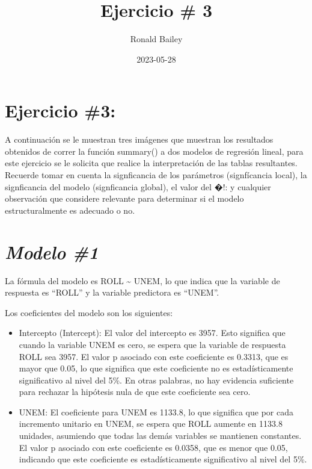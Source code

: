\documentclass[
]{article}
\title{Ejercicio \# 3}
\author{Ronald Bailey}
\date{2023-05-28}
\begin{document}
\maketitle

\hypertarget{ejercicio-3}{%
\section{\texorpdfstring{\textbf{Ejercicio
\#3:}}{Ejercicio \#3:}}\label{ejercicio-3}}

A continuación se le muestran tres imágenes que muestran los resultados
obtenidos de correr la función summary() a dos modelos de regresión
lineal, para este ejercicio se le solicita que realice la interpretación
de las tablas resultantes. Recuerde tomar en cuenta la signficancia de
los parámetros (signfícancia local), la signficancia del modelo
(signficancia global), el valor del �!: y cualquier observación que
considere relevante para determinar si el modelo estructuralmente es
adecuado o no.

\hypertarget{modelo-1}{%
\section{\texorpdfstring{\textbf{\emph{Modelo
\#1}}}{Modelo \#1}}\label{modelo-1}}

La fórmula del modelo es ROLL \textasciitilde{} UNEM, lo que indica que
la variable de respuesta es ``ROLL'' y la variable predictora es
``UNEM''.

Los coeficientes del modelo son los siguientes:

\begin{itemize}
\item
  Intercepto (Intercept): El valor del intercepto es 3957. Esto
  significa que cuando la variable UNEM es cero, se espera que la
  variable de respuesta ROLL sea 3957. El valor p asociado con este
  coeficiente es 0.3313, que es mayor que 0.05, lo que significa que
  este coeficiente no es estadísticamente significativo al nivel del
  5\%. En otras palabras, no hay evidencia suficiente para rechazar la
  hipótesis nula de que este coeficiente sea cero.
\item
  UNEM: El coeficiente para UNEM es 1133.8, lo que significa que por
  cada incremento unitario en UNEM, se espera que ROLL aumente en 1133.8
  unidades, asumiendo que todas las demás variables se mantienen
  constantes. El valor p asociado con este coeficiente es 0.0358, que es
  menor que 0.05, indicando que este coeficiente es estadísticamente
  significativo al nivel del 5\%.
\end{itemize}
\end{document}
